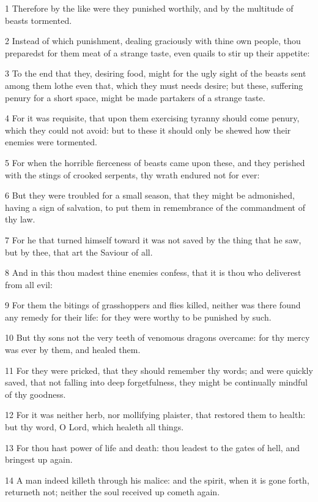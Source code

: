 \par 1 Therefore by the like were they punished worthily, and by the multitude of beasts tormented.
\par 2 Instead of which punishment, dealing graciously with thine own people, thou preparedst for them meat of a strange taste, even quails to stir up their appetite:
\par 3 To the end that they, desiring food, might for the ugly sight of the beasts sent among them lothe even that, which they must needs desire; but these, suffering penury for a short space, might be made partakers of a strange taste.
\par 4 For it was requisite, that upon them exercising tyranny should come penury, which they could not avoid: but to these it should only be shewed how their enemies were tormented.
\par 5 For when the horrible fierceness of beasts came upon these, and they perished with the stings of crooked serpents, thy wrath endured not for ever:
\par 6 But they were troubled for a small season, that they might be admonished, having a sign of salvation, to put them in remembrance of the commandment of thy law.
\par 7 For he that turned himself toward it was not saved by the thing that he saw, but by thee, that art the Saviour of all.
\par 8 And in this thou madest thine enemies confess, that it is thou who deliverest from all evil:
\par 9 For them the bitings of grasshoppers and flies killed, neither was there found any remedy for their life: for they were worthy to be punished by such.
\par 10 But thy sons not the very teeth of venomous dragons overcame: for thy mercy was ever by them, and healed them.
\par 11 For they were pricked, that they should remember thy words; and were quickly saved, that not falling into deep forgetfulness, they might be continually mindful of thy goodness.
\par 12 For it was neither herb, nor mollifying plaister, that restored them to health: but thy word, O Lord, which healeth all things.
\par 13 For thou hast power of life and death: thou leadest to the gates of hell, and bringest up again.
\par 14 A man indeed killeth through his malice: and the spirit, when it is gone forth, returneth not; neither the soul received up cometh again.
